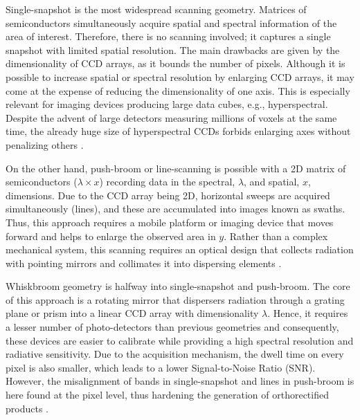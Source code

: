 Single-snapshot is the most widespread scanning geometry. Matrices of semiconductors simultaneously acquire spatial and spectral information of the area of interest. Therefore, there is no scanning involved; it captures a single snapshot with limited spatial resolution. The main drawbacks are given by the dimensionality of CCD arrays, as it bounds the number of pixels. Although it is possible to increase spatial or spectral resolution by enlarging CCD arrays, it may come at the expense of reducing the dimensionality of one axis. This is especially relevant for imaging devices producing large data cubes, e.g., hyperspectral. Despite the advent of large detectors measuring millions of voxels at the same time, the already huge size of hyperspectral CCDs forbids enlarging axes without penalizing others \cite{sousa_uav-based_2022, pu_hyperspectral_2017}. 

On the other hand, push-broom or line-scanning is possible with a 2D matrix of semiconductors ($\lambda \times x$) recording data in the spectral, $\lambda$, and spatial, $x$, dimensions. Due to the CCD array being 2D, horizontal sweeps are acquired simultaneously (lines), and these are accumulated into images known as swaths. Thus, this approach requires a mobile platform or imaging device that moves forward and helps to enlarge the observed area in $y$. Rather than a complex mechanical system, this scanning requires an optical design that collects radiation with pointing mirrors and collimates it into dispersing elements \cite{sousa_uav-based_2022, pu_hyperspectral_2017}. 

Whiskbroom geometry is halfway into single-snapshot and push-broom. The core of this approach is a rotating mirror that dispersers radiation through a grating plane or prism into a linear CCD array with dimensionality $\lambda$. Hence, it requires a lesser number of photo-detectors than previous geometries and consequently, these devices are easier to calibrate while providing a high spectral resolution and radiative sensitivity. Due to the acquisition mechanism, the dwell time on every pixel is also smaller, which leads to a lower Signal-to-Noise Ratio (SNR). However, the misalignment of bands in single-snapshot and lines in push-broom is here found at the pixel level, thus hardening the generation of orthorectified products \cite{pu_hyperspectral_2017}.

